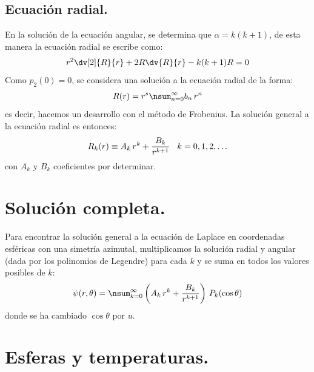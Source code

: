 \subsection{Ecuación radial.}

En la solución de la ecuación angular, se determina que $\alpha = k (k + 1)$, de esta manera la ecuación radial se escribe como:
\begin{align}
r^{2} \dv[2]{R}{r} + 2 R \dv{R}{r} - k(k + 1) R = 0
\label{eq:ecuacion_26_28}
\end{align}
Como $p_{2} (0) = 0$, se considera una solución a la ecuación radial de la forma:
\begin{align*}
R(r) = r^{s} \nsum_{n=0}^{\infty} b_{n} \, r^{n}
\end{align*}
es decir, hacemos un desarrollo con el método de Frobenius. La solución general a la ecuación radial es entonces:
\begin{align*}
R_{k}(r) \equiv A_{k} \, r^{k} + \dfrac{B_{k}}{r^{k+1}} \hspace{0.3cm} k = 0, 1, 2, \ldots
\end{align*}
con $A_{k}$ y $B_{k}$ coeficientes por determinar.

\section{Solución completa.}

Para encontrar la solución general a la ecuación de Laplace en coordenadas esféricas con una simetría azimutal, multiplicamos la solución radial y angular (dada por los polinomios de Legendre) para cada $k$ y se suma en todos los valores posibles de $k$:
\begin{align}
\psi(r, \theta) = \nsum_{k=0}^{\infty} \left( A_{k} \, r^{k} + \dfrac{B_{k}}{r^{k+1}} \right) \, P_{k} (\cos \theta)
\label{eq:ecuacion_26_29}
\end{align}
donde se ha cambiado $\cos \theta$ por $u$.

\section{Esferas y temperaturas.}

